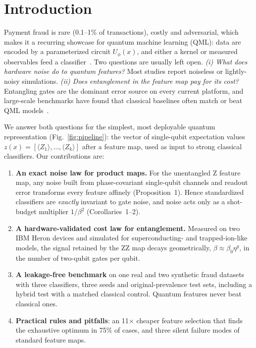 \documentclass[conference,compsoc]{IEEEtran}
\newcommand{\ev}[1]{\langle #1\rangle}
\begin{document}
\section{Introduction}
Payment fraud is rare (0.1--1\% of transactions), costly and adversarial, which makes it a recurring showcase for quantum machine learning (QML): data are encoded by a parameterized circuit $U_\phi(x)$, and either a kernel or measured observables feed a classifier~\cite{havlicek2019,schuld2019,grossi2022}. Two questions are usually left open. \emph{(i) What does hardware noise do to quantum features?} Most studies report noiseless or lightly-noisy simulations. \emph{(ii) Does entanglement in the feature map pay for its cost?} Entangling gates are the dominant error source on every current platform, and large-scale benchmarks have found that classical baselines often match or beat QML models~\cite{bowles2024}.

We answer both questions for the simplest, most deployable quantum representation (Fig.~\ref{fig:pipeline}): the vector of single-qubit expectation values $z(x)=[\ev{Z_1},\dots,\ev{Z_k}]$ after a feature map, used as input to strong classical classifiers. Our contributions are:
\begin{enumerate}
\item \textbf{An exact noise law for product maps.} For the unentangled Z feature map, any noise built from phase-covariant single-qubit channels and readout error transforms every feature affinely (Proposition~1). Hence standardized classifiers are \emph{exactly} invariant to gate noise, and noise acts only as a shot-budget multiplier $1/\beta^2$ (Corollaries~1--2).
\item \textbf{A hardware-validated cost law for entanglement.} Measured on two IBM Heron devices and simulated for superconducting- and trapped-ion-like models, the signal retained by the ZZ map decays geometrically, $\beta\approx\beta_0\eta^{g}$, in the number of two-qubit gates per qubit.
\item \textbf{A leakage-free benchmark} on one real and two synthetic fraud datasets with three classifiers, three seeds and original-prevalence test sets, including a hybrid test with a matched classical control. Quantum features never beat classical ones.
\item \textbf{Practical rules and pitfalls}: an 11$\times$ cheaper feature selection that finds the exhaustive optimum in 75\% of cases, and three silent failure modes of standard feature maps.
\end{enumerate}
\end{document}
